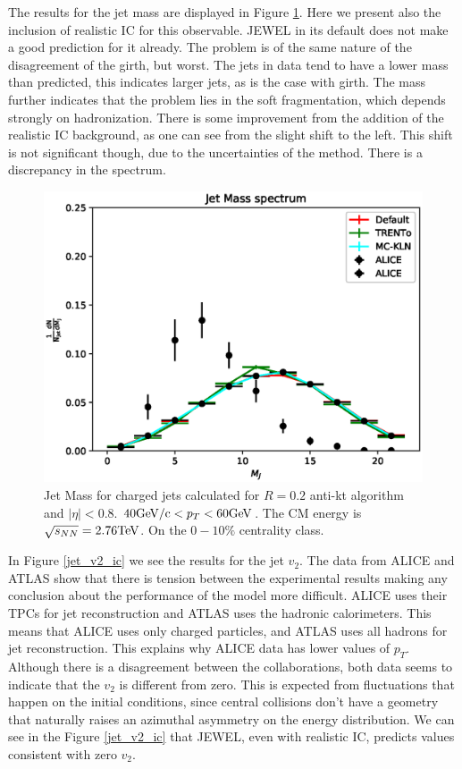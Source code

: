 The results for the jet mass are displayed in Figure \ref{jet_mass_ic}. Here we present also the inclusion of realistic IC for this observable. JEWEL in its default does not make a good prediction for it already. The problem is of the same nature of the disagreement of the girth, but worst. The jets in data tend to have a lower mass than predicted, this indicates larger jets, as is the case with girth. The mass further indicates that the problem lies in the soft fragmentation, which depends strongly on hadronization. There is some improvement from the addition of the realistic IC background, as one can see from the slight shift to the left. This shift is not significant though, due to the uncertainties of the method. There is a discrepancy in the spectrum. 

\begin{figure}
\includegraphics[width=1.0\textwidth]{images/Mass_3.eps}
\caption[Jet Mass with realistic IC]{Jet Mass for charged jets calculated for $R=0.2$ anti-kt algorithm and $|\eta|<0.8$. $40 {\rm GeV/c} < p_T < 60 {\rm GeV}$. The CM energy is $\sqrt{s_{NN}}= 2.76 {\rm TeV}$. On the $0-10\%$ centrality class.}
\label{jet_mass_ic}
\end{figure}

In Figure \ref{jet_v2_ic} we see the results for the jet $v_2$. The data from ALICE and ATLAS show that there is tension between the experimental results making any conclusion about the performance of the model more difficult. ALICE uses their TPCs for jet reconstruction and ATLAS uses the hadronic calorimeters. This means that ALICE uses only charged particles, and ATLAS uses all hadrons for jet reconstruction. This explains why ALICE data has lower values of $p_T$. Although there is a disagreement between the collaborations, both data seems to indicate that the $v_2$ is different from zero. This is expected from fluctuations that happen on the initial conditions, since central collisions don't have a geometry that naturally raises an azimuthal asymmetry on the energy distribution. We can see in the Figure \ref{jet_v2_ic} that JEWEL, even with realistic IC, predicts values consistent with zero $v_2$.

